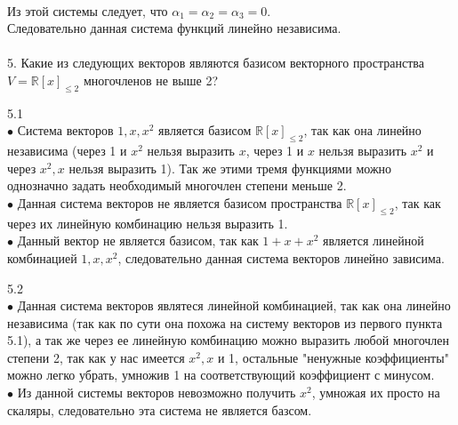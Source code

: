\documentclass[a4paper, 12pt]{article}
\begin{document}
    \\ Из этой системы следует, что $\alpha_1 = \alpha_2 = \alpha_3 = 0$.
    \\ Следовательно данная система функций линейно независима.
    \\
    \\ 5. Какие из следующих векторов являются базисом векторного пространства $V = \mathbb{R}[x]_{\leq 2}$ многочленов не выше 2?
    \\
    \par 5.1 
    \\ $\bullet$ Система векторов $1, x, x^2$ является базисом $\mathbb{R}[x]_{\leq 2}$, так как она линейно независима (через 1 и $x^2$ нельзя выразить $x$, через 1 и $x$ нельзя выразить $x^2$ и через $x^2, x$ нельзя выразить 1). Так же этими тремя функциями можно однозначно задать необходимый многочлен степени меньше 2.
    \\ $\bullet$ Данная система векторов не является базисом пространства $\mathbb{R}[x]_{\leq 2}$, так как через их линейную комбинацию нельзя выразить 1.
    \\ $\bullet$ Данный вектор не является базисом, так как $1 + x + x^2$ является линейной комбинацией $1, x, x^2$, следовательно данная система векторов линейно зависима.
    \\
    \par 5.2
    \\ $\bullet$ Данная система векторов являтеся линейной комбинацией, так как она линейно независима (так как по сути она похожа на систему векторов из первого пункта 5.1), а так же через ее линейную комбинацию можно выразить любой многочлен степени 2, так как у нас имеется $x^2, x$ и 1, остальные "ненужные коэффициенты" можно легко убрать, умножив 1 на соответствующий коэффициент с минусом.
    \\ $\bullet$ Из данной системы векторов невозможно получить $x^2$, умножая их просто на скаляры, следовательно эта система не является базсом.
\end{document}
